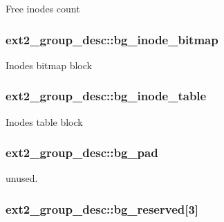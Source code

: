 Free inodes count \hypertarget{structext2__group__desc_a7ba3737304b14529a45aede6381aa968}{
\subsubsection[{bg\+\_\+inode\+\_\+bitmap}]{ ext2\+\_\+group\+\_\+desc\+::bg\+\_\+inode\+\_\+bitmap}}\label{structext2__group__desc_a7ba3737304b14529a45aede6381aa968}
Inodes bitmap block \hypertarget{structext2__group__desc_abf527c572a5fe30354cdf2cfc4f88b26}{
\subsubsection[{bg\+\_\+inode\+\_\+table}]{ ext2\+\_\+group\+\_\+desc\+::bg\+\_\+inode\+\_\+table}}\label{structext2__group__desc_abf527c572a5fe30354cdf2cfc4f88b26}
Inodes table block \hypertarget{structext2__group__desc_ac99983cee73aa4aace5c7d51b6d5a7e1}{
\subsubsection[{bg\+\_\+pad}]{ ext2\+\_\+group\+\_\+desc\+::bg\+\_\+pad}}\label{structext2__group__desc_ac99983cee73aa4aace5c7d51b6d5a7e1}
unused. \hypertarget{structext2__group__desc_aff7f7dc0b67aed284218b238991f5c93}{
\subsubsection[{bg\+\_\+reserved}]{ ext2\+\_\+group\+\_\+desc\+::bg\+\_\+reserved\mbox{[}3\mbox{]}}}\label{structext2__group__desc_aff7f7dc0b67aed284218b238991f5c93}
